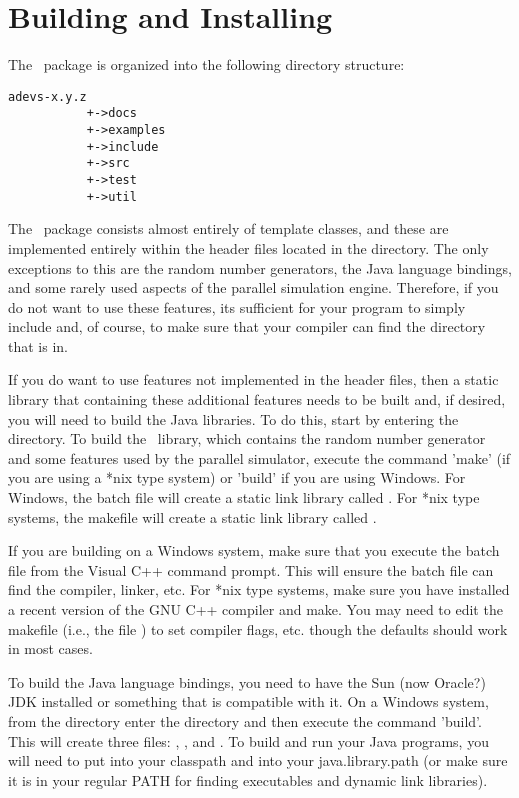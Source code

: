 \chapter{Building and Installing}
The \adevs\ package is organized into the following directory structure:
\begin{verbatim}
adevs-x.y.z
           +->docs
           +->examples
           +->include
           +->src
           +->test
           +->util
\end{verbatim}
The \adevs\ package consists almost entirely of template classes, and these are implemented entirely within the header files located in the  directory. The only exceptions to this are the random number generators, the Java language bindings, and some rarely used aspects of the parallel simulation engine. Therefore, if you do not want to use these features, its sufficient for your program to simply include  and, of course, to make sure that your compiler can find the  directory that  is in. 

If you do want to use features not implemented in the header files, then a static library that containing these additional features needs to be built and, if desired, you will need to build the Java libraries. To do this, start by entering the  directory. To build the \adevs\ library, which contains the random number generator and some features used by the parallel simulator, execute the command 'make' (if you are using a *nix type system) or 'build' if you are using Windows. For Windows, the batch file will create a static link library called . For *nix type systems, the makefile will create a static link library called .

If you are building on a Windows system, make sure that you execute the batch file from the Visual C++ command prompt. This will ensure the batch file can find the compiler, linker, etc. For *nix type systems, make sure you have installed a recent version of the GNU C++ compiler and make. You may need to edit the makefile (i.e., the file ) to set compiler flags, etc. though the defaults should work in most cases.

To build the Java language bindings, you need to have the Sun (now Oracle?) JDK installed or something that is compatible with it. On a Windows system, from the  directory enter the  directory and then execute the command 'build'. This will create three files: , , and . To build and run your Java programs, you will need to put  into your classpath and  into your java.library.path (or make sure it is in your regular PATH for finding executables and dynamic link libraries).

